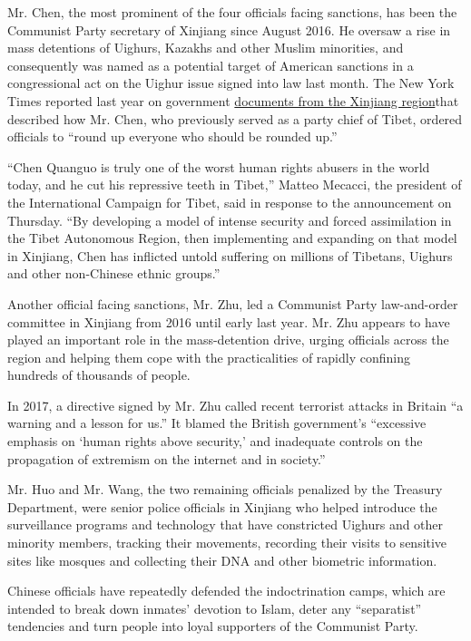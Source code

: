 Mr. Chen, the most prominent of the four officials facing sanctions, has
been the Communist Party secretary of Xinjiang since August 2016. He
oversaw a rise in mass detentions of Uighurs, Kazakhs and other Muslim
minorities, and consequently was named as a potential target of American
sanctions in a congressional act on the Uighur issue signed into law
last month. The New York Times reported last year on government
\href{https://www.nytimes.com/interactive/2019/11/16/world/asia/china-xinjiang-documents.html}{documents
from the Xinjiang region}that described how Mr. Chen, who previously
served as a party chief of Tibet, ordered officials to ``round up
everyone who should be rounded up.''

``Chen Quanguo is truly one of the worst human rights abusers in the
world today, and he cut his repressive teeth in Tibet,'' Matteo Mecacci,
the president of the International Campaign for Tibet, said in response
to the announcement on Thursday. ``By developing a model of intense
security and forced assimilation in the Tibet Autonomous Region, then
implementing and expanding on that model in Xinjiang, Chen has inflicted
untold suffering on millions of Tibetans, Uighurs and other non-Chinese
ethnic groups.''

Another official facing sanctions, Mr. Zhu, led a Communist Party
law-and-order committee in Xinjiang from 2016 until early last year. Mr.
Zhu appears to have played an important role in the mass-detention
drive, urging officials across the region and helping them cope with the
practicalities of rapidly confining hundreds of thousands of people.

In 2017, a directive signed by Mr. Zhu called recent terrorist attacks
in Britain ``a warning and a lesson for us.'' It blamed the British
government's ``excessive emphasis on `human rights above security,' and
inadequate controls on the propagation of extremism on the internet and
in society.''

Mr. Huo and Mr. Wang, the two remaining officials penalized by the
Treasury Department, were senior police officials in Xinjiang who helped
introduce the surveillance programs and technology that have constricted
Uighurs and other minority members, tracking their movements, recording
their visits to sensitive sites like mosques and collecting their DNA
and other biometric information.

Chinese officials have repeatedly defended the indoctrination camps,
which are intended to break down inmates' devotion to Islam, deter any
``separatist'' tendencies and turn people into loyal supporters of the
Communist Party.

